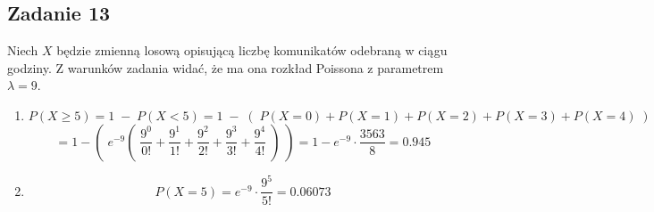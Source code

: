\subsection{Zadanie 13}
Niech $X$ będzie zmienną losową opisującą liczbę komunikatów odebraną w ciągu godziny. Z warunków zadania widać, że ma ona rozkład Poissona z parametrem $\lambda = 9$.

\begin{enumerate}
	\item 
	
	$$
	P(X \geq 5) = 1\;-\;P(X < 5) = 1\;-\;(\;P(X = 0) + P(X = 1) + P(X = 2) +P(X = 3) + P(X = 4)\;) 
	$$ 
	$$
	 = 1 - (\;e^{-9} (\;\frac{9^{0}}{0!} + \frac{9^{1}}{1!} + \frac{9^{2}}{2!} + \frac{9^{3}}{3!} + \frac{9^{4}}{4!}\;)\;) = 	1 - e^{-9}\cdot \frac{3563}{8} = 0.945
	$$ 
	\item 
	$$
	P(X = 5) = e^{-9} \cdot \frac{9^{5}}{5!} = 0.06073
	$$ 	
\end{enumerate}
